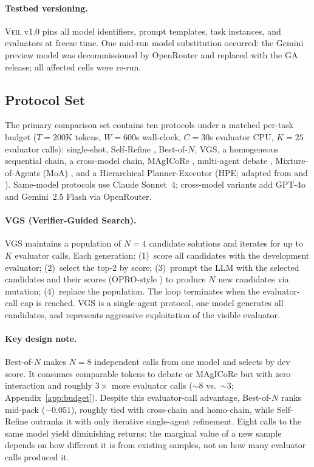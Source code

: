 \documentclass{article}
\begin{document}
\paragraph{Testbed versioning.}
\textsc{Veil} v1.0 pins all model identifiers, prompt templates, task instances, and evaluators at freeze time. One mid-run model substitution occurred: the Gemini preview model was decommissioned by OpenRouter and replaced with the GA release; all affected cells were re-run.

\subsection{Protocol Set}
\label{sec:protocols}

The primary comparison set contains ten protocols under a matched per-task budget ($T{=}200$K tokens, $W{=}600$s wall-clock, $C{=}30$s evaluator CPU, $K{=}25$ evaluator calls): single-shot, Self-Refine \citep{madaan2023selfrefine}, Best-of-$N$, VGS, a homogeneous sequential chain, a cross-model chain, MAgICoRe \citep{chen2025magicore}, multi-agent debate \citep{du2024debate}, Mixture-of-Agents (MoA) \citep{wang2025moa}, and a Hierarchical Planner-Executor (HPE; adapted from \citet{wang2023plansolve} and \citet{hong2023metagpt}). Same-model protocols use Claude Sonnet~4; cross-model variants add GPT-4o and Gemini~2.5 Flash via OpenRouter.

\paragraph{VGS (Verifier-Guided Search).}
VGS maintains a population of $N{=}4$ candidate solutions and iterates for up to $K$ evaluator calls. Each generation: (1)~score all candidates with the development evaluator; (2)~select the top-2 by score; (3)~prompt the LLM with the selected candidates and their scores (OPRO-style \citep{yang2024opro}) to produce $N$ new candidates via mutation; (4)~replace the population. The loop terminates when the evaluator-call cap is reached. VGS is a single-agent protocol, one model generates all candidates, and represents aggressive exploitation of the visible evaluator.

\paragraph{Key design note.}
Best-of-$N$ makes $N{=}8$ independent calls from one model and selects by dev score. It consumes comparable tokens to debate or MAgICoRe but with zero interaction and roughly $3{\times}$ more evaluator calls (${\sim}8$ vs.\ ${\sim}3$; Appendix~\ref{app:budget}). Despite this evaluator-call advantage, Best-of-$N$ ranks mid-pack ($-0.051$), roughly tied with cross-chain and homo-chain, while Self-Refine outranks it with only iterative single-agent refinement. Eight calls to the same model yield diminishing returns; the marginal value of a new sample depends on how different it is from existing samples, not on how many evaluator calls produced it.
\end{document}
